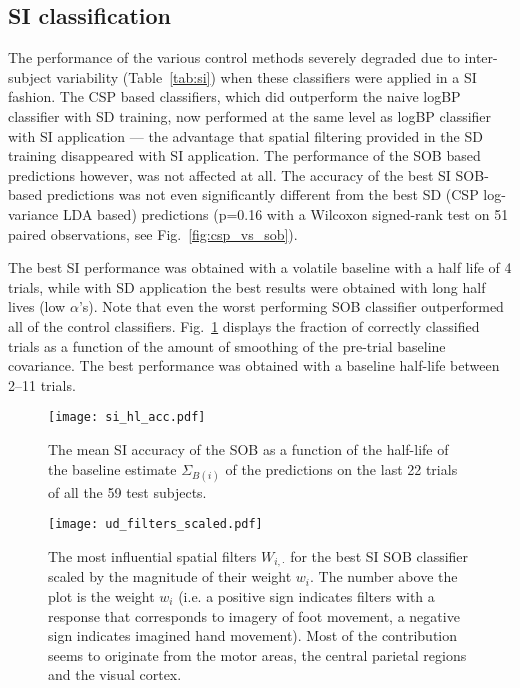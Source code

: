 \subsection{\protect\Acl{SI} classification}
\begin{sloppypar}
The performance of the various control methods severely degraded due to
inter-subject variability (Table~\ref{tab:si}) when these classifiers were
applied in a \acf{SI} fashion.
%
The \ac{CSP} based classifiers, which did outperform the naive \ac{logBP}
classifier with \acl{SD} training, now performed at the same level as \ac{logBP}
classifier with \ac{SI} application --- the advantage that spatial filtering
provided in the \ac{SD} training disappeared with \ac{SI} application.
%
The performance of the \ac{SOB} based predictions however, was not affected at
all. The accuracy of the best \acl{SI} \ac{SOB}-based predictions was not even
significantly different from the best \acl{SD} (\ac{CSP} log-variance \ac{LDA}
based) predictions (p=0.16 with a Wilcoxon signed-rank test on 51 paired
observations, see Fig.~\ref{fig:csp_vs_sob}).
\end{sloppypar}
 
The best \ac{SI} performance was obtained with a volatile baseline with a half
life of 4 trials, while with \ac{SD} application the best results were obtained
with long half lives (low $\alpha$'s). Note that even the worst performing
\ac{SOB} classifier outperformed all of the control classifiers.
%
Fig.~\ref{fig:csob_acc} displays the fraction of correctly classified trials as
a function of the amount of smoothing of the pre-trial baseline covariance. The
best performance was obtained with a baseline half-life between 2--11 trials.

\begin{figure}
  \center \texttt{[image: si\_hl\_acc.pdf]} 
  \caption{The mean \protect\ac{SI} accuracy of the \protect\ac{SOB} as a
  function of the half-life of the baseline estimate $\Sigma_{B(i)}$ of the
  predictions on the last 22 trials of all the 59 test subjects. 
  }
  \label{fig:csob_acc}
\end{figure}

\begin{figure}
  \center \texttt{[image: ud\_filters\_scaled.pdf]} 
  \caption{The most influential spatial filters $W_{i,\cdot}$ for the best
  \protect\ac{SI} \protect\ac{SOB} classifier scaled by the magnitude of their
  weight $w_i$. The number above the plot is the weight $w_i$ (i.e. a positive
  sign indicates filters with a response that corresponds to imagery of foot
  movement, a negative sign indicates imagined hand movement). Most of the
  contribution seems to originate from the motor areas, the central parietal
  regions and the visual cortex.}
  \label{fig:ud_patt}
\end{figure}

